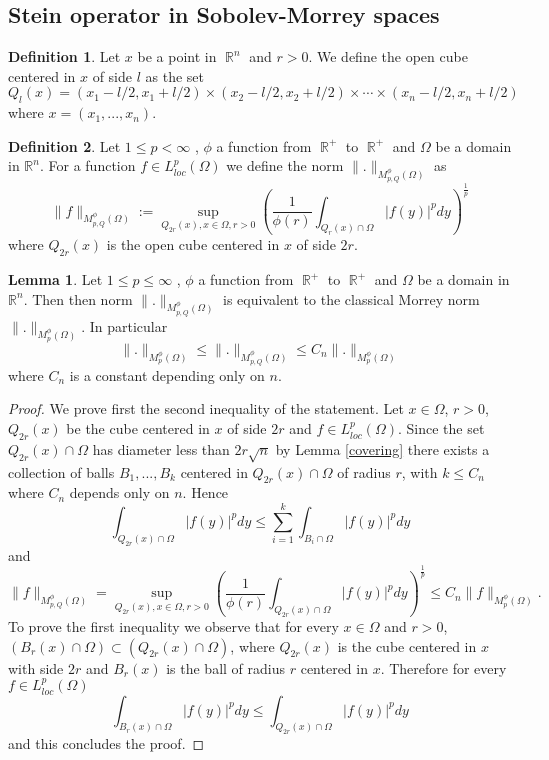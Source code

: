 \documentclass[12pt]{article}
\theoremstyle{definition}
\newtheorem{definition}{Definition}
\newtheorem{lemma}{Lemma}
\DeclareMathOperator\rr{\mathbb{R}}
\begin{document}
\subsection{Stein operator in Sobolev-Morrey spaces}

\begin{definition}
Let $x$ be a point in $\rr^n$ and $r>0$. We define the open cube centered in $x$ of side $l$ as the set 
\[ Q_l(x)=(x_1-l/2,x_1+l/2) \times (x_2-l/2,x_2+l/2) \times \cdots \times (x_n-l/2,x_n+l/2)   \]
where $x=(x_1,...,x_n).$
\end{definition}


\begin{definition}
Let $1\le p< \infty$ , $\phi$ a function from $\rr^+$ to $\rr^+$ and $\Omega$ be a domain in $\mathbb{R}^n$. For a function $f \in L^p_{loc}(\Omega)$ we define the norm $\| .\|_{M_{p,Q}^\phi(\Omega)}$ as
\[ \|f\|_{M_{p,Q}^\phi(\Omega)}:=\sup_{Q_{2r}(x), x \in \Omega,r>0} \left(  \frac{1}{\phi(r)}\int_{Q_r(x)\cap \Omega} |f(y)|^p dy \right )^{\frac{1}{p}}\]
where $Q_{2r}(x)$ is the open cube centered in $x$ of side $2r$.
\end{definition}
\begin{lemma}\label{cubicmorrey}
Let $1\le p\le \infty$ , $\phi$ a function from $\rr^+$ to $\rr^+$ and $\Omega$ be a domain in $\mathbb{R}^n$. Then then norm $\| .\|_{M_{p,Q}^\phi(\Omega)}$ is equivalent to the classical Morrey norm $\|.\|_{M_{p}^\phi(\Omega)}$. In particular 
\[ \| .\|_{M_{p}^\phi(\Omega)} \le \| .\|_{M_{p,Q}^\phi(\Omega)}\le C_{n}\| .\|_{M_{p}^\phi(\Omega)}\]
where $C_n$ is a constant depending only on $n.$
\end{lemma}

\begin{proof}
We prove first the second inequality of the statement. Let $x \in \Omega$, $r>0$, $Q_{2r}(x)$ be the cube centered in $x$ of side $2r$ and $f \in L^p_{loc}(\Omega)$. Since the set $Q_{2r}(x) \cap \Omega$ has diameter less than $2r\sqrt n$ by Lemma \ref{covering} there exists a collection of balls $B_1,...,B_k$ centered in $Q_{2r}(x) \cap \Omega$ of radius $r$, with $k\le C_n$ where $C_n$ depends only on $n.$ Hence 
\[ 	\int_{Q_{2r}(x)\cap\Omega} |f(y)|^p dy \le \sum_{i=1}^k \int_{B_i\cap\Omega} |f(y)|^p dy\]
and
\[ \| f\|_{M_{p,Q}^\phi(\Omega)}=\sup_{Q_{2r}(x) ,x \in \Omega,r>0} \left( \frac{1}{\phi(r)}\int_{Q_{2r}(x)\cap\Omega} |f(y)|^p dy \right)^{\frac{1}{p}} \le C_n \| f\|_{M_p^\phi(\Omega)}.\]
To prove the first inequality we observe that for every $x \in \Omega$ and $r>0$, $(B_r(x)\cap\Omega)\subset (Q_{2r}(x)\cap\Omega)$, where $Q_{2r}(x)$ is the cube centered in $x$ with side $2r$ and $B_r(x)$ is the ball of radius $r$ centered in $x$. Therefore for every $f \in L^p_{loc}(\Omega)$
\[ \int_{B_r(x)\cap\Omega} |f(y)|^p dy \le \int_{Q_{2r}(x)\cap\Omega} |f(y)|^p dy\]
and this concludes the proof.

\end{proof}
\end{document}
